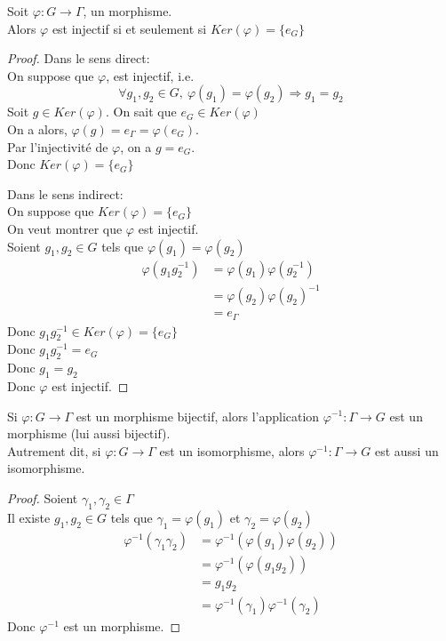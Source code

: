 \documentclass[../main.tex]{subfile}
\begin{document}
\begin{prop}
	Soit $\varphi : G \to \Gamma$, un morphisme.\\
	Alors $\varphi$ est injectif si et seulement si $Ker(\varphi) = \{e_G\}$
\end{prop}

\begin{proof}
	Dans le sens direct:\\
	On suppose que $\varphi$, est injectif, i.e.
	$$\forall g_1, g_2 \in G, \ \varphi(g_1) = \varphi(g_2) \Rightarrow g_1 = g_2$$
	Soit $g \in Ker(\varphi)$.
	On sait que $e_G \in Ker(\varphi)$\\
	On a alors, $\varphi(g) = e_\Gamma = \varphi(e_G)$.\\
	Par l'injectivité de $\varphi$, on a $g = e_G$.\\
	Donc $Ker(\varphi) = \{e_G\}$

	Dans le sens indirect:\\
	On suppose que $Ker(\varphi) = \{e_G\}$\\
	On veut montrer que $\varphi$ est injectif.\\
	Soient $g_1, g_2 \in G$ tels que $\varphi(g_1) = \varphi(g_2)$\\
	$$
\begin{aligned}
	\varphi(g_1g_2^{-1}) &= \varphi(g_1)\varphi(g_2^{-1})\\
	&= \varphi(g_2) \varphi(g_2)^{-1}\\
	&= e_\Gamma
\end{aligned}
	$$
	Donc $g_1g_2^{-1} \in Ker(\varphi) = \{e_G\}$\\
	Donc $g_1g_2^{-1} = e_G$\\
	Donc $g_1 = g_2$\\
	Donc $\varphi$ est injectif.
\end{proof}

\begin{prop}
	Si $\varphi : G \to \Gamma$ est un morphisme bijectif, alors l'application $\varphi^{-1} : \Gamma \to G$ est un morphisme (lui aussi bijectif).\\
	Autrement dit, si $\varphi : G \to \Gamma$ est un isomorphisme, alors $\varphi^{-1} : \Gamma \to G$ est aussi un isomorphisme.
\end{prop}

\begin{proof}
	Soient $\gamma_1, \gamma_2 \in \Gamma$\\
	Il existe $g_1, g_2 \in G$ tels que $\gamma_1 = \varphi(g_1)$ et $\gamma_2 = \varphi(g_2)$
	$$
\begin{aligned}
	\varphi^{-1}(\gamma_1\gamma_2) &= \varphi^{-1}(\varphi(g_1)\varphi(g_2))\\
	&= \varphi^{-1}(\varphi(g_1g_2))\\
	&= g_1g_2\\
	&= \varphi^{-1}(\gamma_1)\varphi^{-1}(\gamma_2)
\end{aligned}
	$$
	Donc $\varphi^{-1}$ est un morphisme.
\end{proof}
\end{document}
